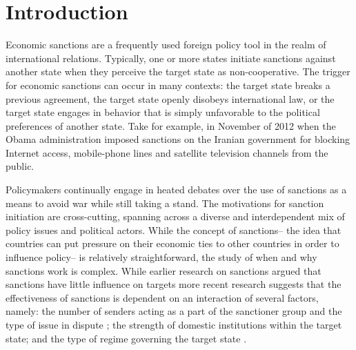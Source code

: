 \section*{Introduction}
\label{intro}

Economic sanctions are a frequently used foreign policy tool in the realm of international relations. Typically, one or more states initiate sanctions against another state when they perceive the target state as non-cooperative. The trigger for economic sanctions can occur in many contexts: the target state breaks a previous agreement, the target state openly disobeys international law, or the target state engages in behavior that is simply unfavorable to the political preferences of another state. Take for example, in November of 2012 when the Obama administration imposed sanctions on the Iranian government for blocking Internet access, mobile-phone lines and satellite television channels from the public. 

Policymakers continually engage in heated debates over the use of sanctions as a means to avoid war while still taking a stand. The motivations for sanction initiation are cross-cutting, spanning across a diverse and interdependent mix of policy issues and political actors. While the concept of sanctions-- the idea that countries can put pressure on their economic ties to other countries in order to influence policy-- is relatively straightforward, the study of when and why sanctions work is complex. While earlier research on sanctions argued that sanctions have little influence on targets \citep{lam1990, dashti1997, morgan1997, drezner1998} more recent research suggests that the effectiveness of sanctions is dependent on an interaction of several factors, namely: the number of senders acting as a part of the sanctioner group and the type of issue in dispute \citep{miers2002}; the strength of domestic institutions within the target state; and the type of regime governing the target state \citep{mcgillivray2004}. 


